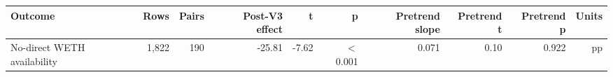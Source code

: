 \begin{tabular}{lrrrrrrrrr}
\toprule
Outcome & Rows & Pairs & Post-V3 effect & t & p & Pretrend slope & Pretrend t & Pretrend p & Units \\
\midrule
No-direct WETH availability & 1,822 & 190 & -25.81 & -7.62 & \ensuremath{<}0.001 & 0.071 & 0.10 & 0.922 & pp \\
\bottomrule
\end{tabular}
